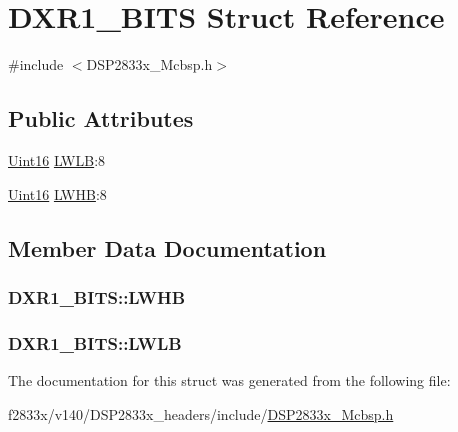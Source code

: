 \hypertarget{struct_d_x_r1___b_i_t_s}{}\section{D\+X\+R1\+\_\+\+B\+I\+T\+S Struct Reference}
\label{struct_d_x_r1___b_i_t_s}


{\ttfamily \#include $<$D\+S\+P2833x\+\_\+\+Mcbsp.\+h$>$}

\subsection*{Public Attributes}
\begin{DoxyCompactItemize}
\item 
\hyperlink{_d_s_p2833x___device_8h_a59a9f6be4562c327cbfb4f7e8e18f08b}{Uint16} \hyperlink{struct_d_x_r1___b_i_t_s_ac14a61a37392d8c80b54d26572cc4fbf}{L\+W\+L\+B}\+:8
\item 
\hyperlink{_d_s_p2833x___device_8h_a59a9f6be4562c327cbfb4f7e8e18f08b}{Uint16} \hyperlink{struct_d_x_r1___b_i_t_s_a0a312cc74543d14e0a79ab006e30d924}{L\+W\+H\+B}\+:8
\end{DoxyCompactItemize}


\subsection{Member Data Documentation}
\hypertarget{struct_d_x_r1___b_i_t_s_a0a312cc74543d14e0a79ab006e30d924}{}
\subsubsection[{L\+W\+H\+B}]{ D\+X\+R1\+\_\+\+B\+I\+T\+S\+::\+L\+W\+H\+B}\label{struct_d_x_r1___b_i_t_s_a0a312cc74543d14e0a79ab006e30d924}
\hypertarget{struct_d_x_r1___b_i_t_s_ac14a61a37392d8c80b54d26572cc4fbf}{}
\subsubsection[{L\+W\+L\+B}]{ D\+X\+R1\+\_\+\+B\+I\+T\+S\+::\+L\+W\+L\+B}\label{struct_d_x_r1___b_i_t_s_ac14a61a37392d8c80b54d26572cc4fbf}


The documentation for this struct was generated from the following file\+:\begin{DoxyCompactItemize}
\item 
f2833x/v140/\+D\+S\+P2833x\+\_\+headers/include/\hyperlink{_d_s_p2833x___mcbsp_8h}{D\+S\+P2833x\+\_\+\+Mcbsp.\+h}\end{DoxyCompactItemize}
